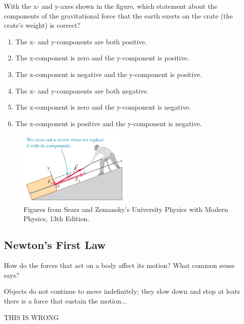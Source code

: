 \documentclass[]{beamer}
\begin{document}
 \begin{frame}


 With the x- and y-axes shown in the figure, which statement
 about the components of the gravitational force that the earth exerts on the crate
 (the crate’s weight) is correct? 
 \vspace{3mm}

\begin{enumerate}
  \item The x- and y-components are both positive.
  \item The   x-component is zero and the y-component is positive.
  \item The x-component is negative   and the y-component is positive.
  \item The x- and y-components are both negative.
  \item The x-component is zero and the y-component is negative.
  \item The x-component is   positive and the y-component is negative.
\end{enumerate}


 \begin{figure}[h!]  
  \includegraphics[width=0.5\textwidth]{images/f9.jpg}
  \caption{ {\tiny Figures from Sears and Zemansky's University Physics 
  with Modern Physics, 13th Edition.} }
\end{figure}


\end{frame}




\subsection{Newton's First Law}
 \begin{frame}

  How do the forces that act on a body affect its motion?
 \pause
What common sense says? 
\pause

Objects do not continue to move indefinitely; they slow
down and stop at leats there is a force that sustain the motion...


\pause
THIS IS WRONG
 
 \end{frame}
\end{document}
